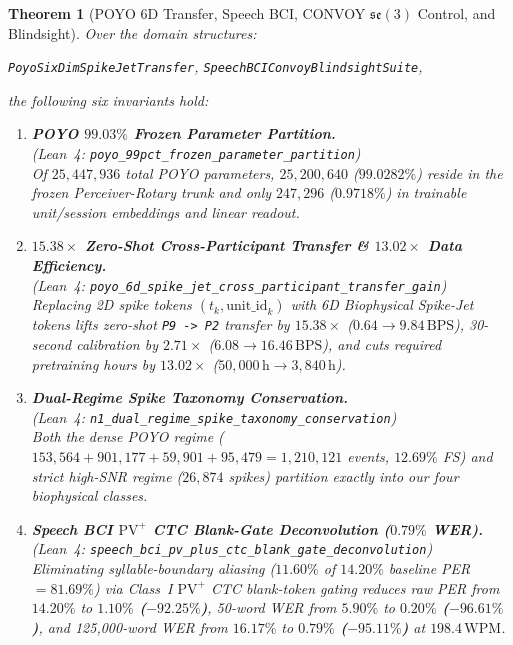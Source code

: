\documentclass[11pt,letterpaper]{article}
\newcommand{\lean}[1]{\nolinkurl{#1}}
\newtheorem{theorem}{Theorem}[section]
\theoremstyle{definition}
\begin{document}
\begin{theorem}[POYO 6D Transfer, Speech BCI, CONVOY $\mathfrak{se}(3)$ Control, and Blindsight]\label{thm:pillar12}
Over the domain structures:
\begin{center}
\footnotesize
\lean{PoyoSixDimSpikeJetTransfer}, \quad \lean{SpeechBCIConvoyBlindsightSuite},
\end{center}
the following six invariants hold:
\begin{enumerate}
  \item \textbf{POYO $99.03\%$ Frozen Parameter Partition.}\\
  (\emph{Lean~4:} \lean{poyo_99pct_frozen_parameter_partition})\\
  Of $25{,}447{,}936$ total POYO parameters, $25{,}200{,}640$ ($99.0282\%$) reside in the frozen Perceiver-Rotary trunk and only $247{,}296$ ($0.9718\%$) in trainable unit/session embeddings and linear readout.
  \item \textbf{$15.38\times$ Zero-Shot Cross-Participant Transfer \& $13.02\times$ Data Efficiency.}\\
  (\emph{Lean~4:} \lean{poyo_6d_spike_jet_cross_participant_transfer_gain})\\
  Replacing 2D spike tokens $(t_k, \mathrm{unit\_id}_k)$ with 6D Biophysical Spike-Jet tokens lifts zero-shot \texttt{P9 -> P2} transfer by \textbf{$15.38\times$} ($0.64 \to 9.84\,\text{BPS}$), 30-second calibration by \textbf{$2.71\times$} ($6.08 \to 16.46\,\text{BPS}$), and cuts required pretraining hours by \textbf{$13.02\times$} ($50{,}000\,\text{h} \to 3{,}840\,\text{h}$).
  \item \textbf{Dual-Regime Spike Taxonomy Conservation.}\\
  (\emph{Lean~4:} \lean{n1_dual_regime_spike_taxonomy_conservation})\\
  Both the dense POYO regime ($153{,}564 + 901{,}177 + 59{,}901 + 95{,}479 = 1{,}210{,}121$ events, $12.69\%$ FS) and strict high-SNR regime ($26{,}874$ spikes) partition exactly into our four biophysical classes.
  \item \textbf{Speech BCI $\text{PV}^+$ CTC Blank-Gate Deconvolution ($0.79\%$ WER).}\\
  (\emph{Lean~4:} \lean{speech_bci_pv_plus_ctc_blank_gate_deconvolution})\\
  Eliminating syllable-boundary aliasing ($11.60\%$ of $14.20\%$ baseline PER $= 81.69\%$) via Class~I $\text{PV}^+$ CTC blank-token gating reduces raw PER from $14.20\%$ to \textbf{$1.10\%$ ($-92.25\%$)}, 50-word WER from $5.90\%$ to \textbf{$0.20\%$ ($-96.61\%$)}, and 125,000-word WER from $16.17\%$ to \textbf{$0.79\%$ ($-95.11\%$)} at $198.4\,\text{WPM}$.

\end{enumerate}
\end{theorem}
\end{document}
